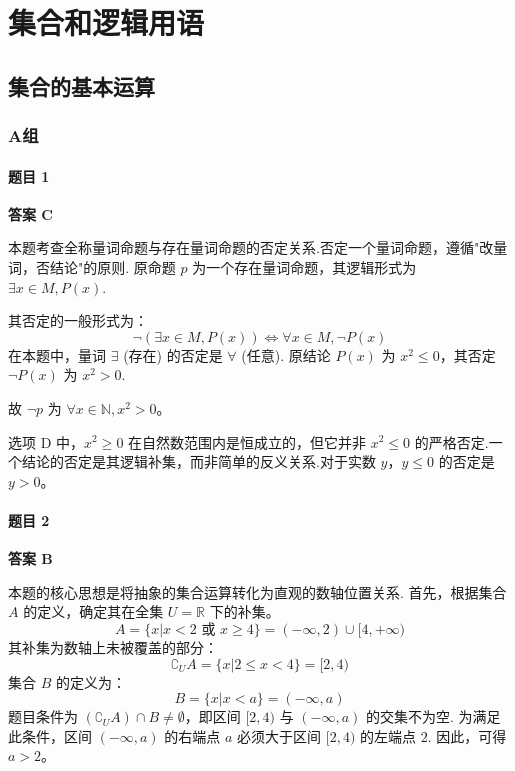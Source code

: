 \chapter{集合和逻辑用语}

\section{集合的基本运算}

\subsection*{A组}

\subsubsection*{题目 1}
\begin{solution}
	\textbf{答案 C}
	
	本题考查全称量词命题与存在量词命题的否定关系.否定一个量词命题，遵循"改量词，否结论"的原则.
	原命题 $p$ 为一个存在量词命题，其逻辑形式为 $\exists x \in M, P(x)$.
	
	其否定的一般形式为：
	\[ \neg (\exists x \in M, P(x)) \iff \forall x \in M, \neg P(x) \]
	在本题中，量词 $\exists$ (存在) 的否定是 $\forall$ (任意).
	原结论 $P(x)$ 为 $x^2 \le 0$，其否定 $\neg P(x)$ 为 $x^2 > 0$.
	
	故 $\neg p$ 为 $\forall x \in \mathbb{N}, x^2 > 0$。
\end{solution}

\begin{note}
	选项 D 中，$x^2 \ge 0$ 在自然数范围内是恒成立的，但它并非 $x^2 \le 0$ 的严格否定.一个结论的否定是其逻辑补集，而非简单的反义关系.对于实数 $y$，$y \le 0$ 的否定是 $y>0$。
\end{note}

\subsubsection*{题目 2}
\begin{solution}
	\textbf{答案 B}
	
	本题的核心思想是将抽象的集合运算转化为直观的数轴位置关系.
	首先，根据集合 $A$ 的定义，确定其在全集 $U=\mathbb{R}$ 下的补集。
	\[ A = \{x|x<2 \text{ 或 } x \ge 4\} = (-\infty, 2) \cup [4, +\infty) \]
	其补集为数轴上未被覆盖的部分：
	\[ \complement_U A = \{x|2 \le x < 4\} = [2, 4) \]
	集合 $B$ 的定义为：
	\[ B = \{x|x<a\} = (-\infty, a) \]
	题目条件为 $(\complement_U A) \cap B \neq \emptyset$，即区间 $[2, 4)$ 与 $(-\infty, a)$ 的交集不为空.
	为满足此条件，区间 $(-\infty, a)$ 的右端点 $a$ 必须大于区间 $[2,4)$ 的左端点 $2$.
	因此，可得 $a > 2$。
\end{solution}

